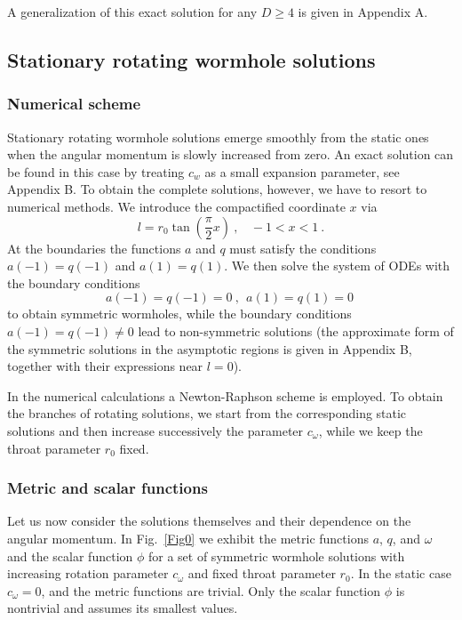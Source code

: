 \documentclass[showpacs,preprintnumbers,amsmath,amssymb,floatfix]{revtex4}
\begin{document}
A generalization of this exact solution for any $D\geq 4$ is given in Appendix A.


\subsection{Stationary rotating wormhole solutions}

\subsubsection{Numerical scheme}

Stationary rotating wormhole solutions emerge smoothly from
the static ones when the angular momentum is slowly increased from zero.
An exact solution can be found in this case by treating $c_w$ as 
a small expansion parameter, see Appendix B.
To obtain the complete solutions, however, we have to resort to numerical methods.
We introduce the compactified coordinate $x$ via
%
\begin{equation}
l = r_0 \tan\left(\frac{\pi}{2} x\right) \ , \ \ \ \ 
-1 < x < 1 \ .
\end{equation}
%
At the boundaries the functions $a$ and $q$ must satisfy
the conditions
$a(-1) =  q(-1)$ and $a(1)= q(1)$.
We then solve
the system of ODEs with the boundary conditions
%
\begin{equation}
a(-1) =  q(-1) = 0 \ , \ \ a(1)= q(1) = 0 \ 
\end{equation}
to obtain symmetric wormholes, while the boundary conditions
$a(-1) =  q(-1) \ne 0$ lead to non-symmetric solutions (the approximate
form of the symmetric solutions in the asymptotic regions is given in Appendix B,
together with their expressions near $l=0$).

In the numerical calculations
a Newton-Raphson scheme is employed.
To obtain the branches of rotating solutions, we start from the corresponding static solutions
and then increase successively the parameter $c_\omega$,
while  we keep the throat parameter $r_0$ fixed. 


\subsubsection{Metric and scalar functions}

Let us now consider the solutions themselves and their dependence on
the angular momentum.
In Fig.~\ref{Fig0} we exhibit the metric functions $a$, $q$, and $\omega$
and the scalar function $\phi$
for a set of symmetric wormhole solutions with increasing rotation parameter
$c_\omega$ and fixed throat parameter $r_0$. 
In the static case $c_\omega=0$, and the metric functions
are trivial. Only the scalar function $\phi$ is nontrivial and
assumes its smallest values.
\end{document}
